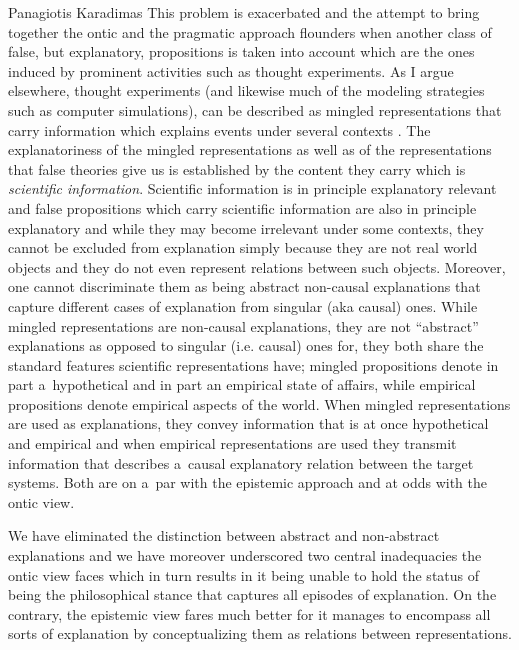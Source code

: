 \begin{artengenv}{Panagiotis Karadimas}
This problem is exacerbated and the attempt to bring together the ontic and the pragmatic approach flounders when another class of false, but explanatory, propositions is taken into account which are the ones induced by prominent activities such as thought experiments. As I argue elsewhere, thought experiments (and likewise much of the modeling strategies such as computer simulations), can be described as mingled representations that carry information which explains events under several contexts
\parencite[][]{karadimas_thought_2022}. %
 The explanatoriness of the mingled representations as well as of the representations that false theories give us is established by the content they carry which is \textit{scientific information}. Scientific information is in principle explanatory relevant 
\parencites[][]{van_fraassen_scientific_1980}[][]{richardson_explanation_1995} %
 and false propositions which carry scientific information are also in principle explanatory and while they may become irrelevant under some contexts, they cannot be excluded from explanation simply because they are not real world objects and they do not even represent relations between such objects. Moreover, one cannot discriminate them as being abstract non-causal explanations that capture different cases of explanation from singular (aka causal) ones. While mingled representations are non-causal explanations, they are not ``abstract'' explanations as opposed to singular (i.e. causal) ones for, they both share the standard features scientific representations have; mingled propositions denote in part a~hypothetical and in part an empirical state of affairs, while empirical propositions denote empirical aspects of the world. When mingled representations are used as explanations, they convey information that is at once hypothetical and empirical and when empirical representations are used they transmit information that describes a~causal explanatory relation between the target systems. Both are on a~par with the epistemic approach and at odds with the ontic view.

We have eliminated the distinction between abstract and non-abstract explanations and we have moreover underscored two central inadequacies the ontic view faces which in turn results in it being unable to hold the status of being the philosophical stance that captures all episodes of explanation. On the contrary, the epistemic view fares much better for it manages to encompass all sorts of explanation by conceptualizing them as relations between representations.


\end{artengenv}
